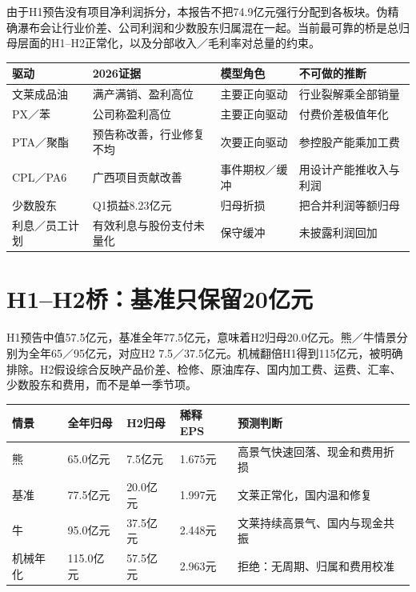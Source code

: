 由于H1预告没有项目净利润拆分，本报告不把74.9亿元强行分配到各板块。伪精确瀑布会让行业价差、公司利润和少数股东归属混在一起。当前最可靠的桥是总归母层面的H1--H2正常化，以及分部收入／毛利率对总量的约束。

\begin{exhibitbox}[盈利驱动与模型信用]
\small
\noindent\begin{tabularx}{\textwidth}{L{3.0cm}L{2.7cm}L{2.55cm}X}
\toprule
\textbf{驱动} & \textbf{2026证据} & \textbf{模型角色} & \textbf{不可做的推断} \\
\midrule
文莱成品油 & 满产满销、盈利高位 & 主要正向驱动 & 行业裂解乘全部销量 \\
PX／苯 & 公司称盈利高位 & 主要正向驱动 & 付费价差极值年化 \\
PTA／聚酯 & 预告称改善，行业修复不均 & 次要正向驱动 & 参控股产能乘加工费 \\
CPL／PA6 & 广西项目贡献改善 & 事件期权／缓冲 & 用设计产能推收入与利润 \\
少数股东 & Q1损益8.23亿元 & 归母折损 & 把合并利润等额归母 \\
利息／员工计划 & 有效利息与股份支付未量化 & 保守缓冲 & 未披露利润回加 \\
\bottomrule
\end{tabularx}
\end{exhibitbox}

\section{H1--H2桥：基准只保留20亿元}

H1预告中值57.5亿元，基准全年77.5亿元，意味着H2归母20.0亿元。熊／牛情景分别为全年65／95亿元，对应H2 7.5／37.5亿元。机械翻倍H1得到115亿元，被明确排除。H2假设综合反映产品价差、检修、原油库存、国内加工费、运费、汇率、少数股东和费用，而不是单一季节项。

\begin{exhibitbox}[H2敏感性与每股影响]
\noindent\begin{tabularx}{\textwidth}{L{2.4cm}R{2.0cm}R{2.0cm}R{2.0cm}X}
\toprule
\textbf{情景} & \textbf{全年归母} & \textbf{H2归母} & \textbf{稀释EPS} & \textbf{预测判断} \\
\midrule
熊 & 65.0亿元 & 7.5亿元 & 1.675元 & 高景气快速回落、现金和费用折损 \\
基准 & 77.5亿元 & 20.0亿元 & 1.997元 & 文莱正常化，国内温和修复 \\
牛 & 95.0亿元 & 37.5亿元 & 2.448元 & 文莱持续高景气、国内与现金共振 \\
机械年化 & 115.0亿元 & 57.5亿元 & 2.963元 & 拒绝：无周期、归属和费用校准 \\
\bottomrule
\end{tabularx}
\end{exhibitbox}

